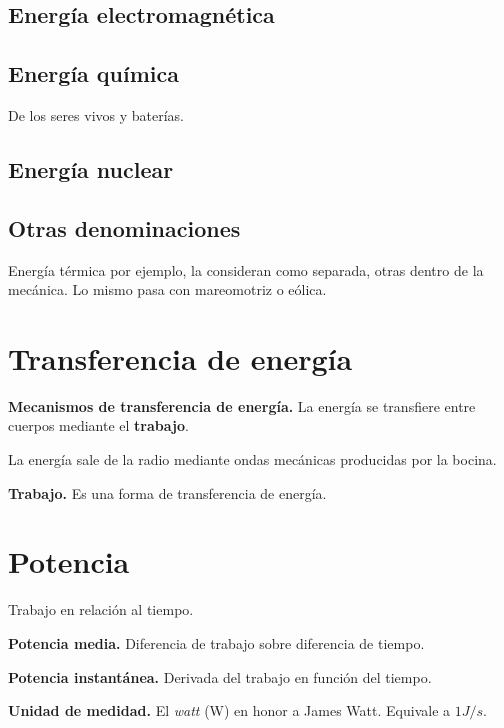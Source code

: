 \documentclass[12pt]{article}
\begin{document}
\subsection{Energía electromagnética}

\subsection{Energía química}
De los seres vivos y baterías.

\subsection{Energía nuclear}

\subsection{Otras denominaciones}
Energía térmica por ejemplo,
la consideran como separada,
otras dentro de la mecánica.
Lo mismo pasa con mareomotriz o eólica.

\section{Transferencia de energía}

\textbf{Mecanismos de transferencia de energía.}
La energía se transfiere entre cuerpos mediante el \textbf{trabajo}.

La energía sale de la radio mediante ondas mecánicas producidas por la bocina.

\textbf{Trabajo.} Es una forma de transferencia de energía.

\section{Potencia}

Trabajo en relación al tiempo.

\textbf{Potencia media.}
Diferencia de trabajo sobre diferencia de tiempo.

\textbf{Potencia instantánea.}
Derivada del trabajo en función del tiempo.

\textbf{Unidad de medidad.}
El \textit{watt} (W) en honor a James Watt.
Equivale a \(1 J/s\).
\end{document}
